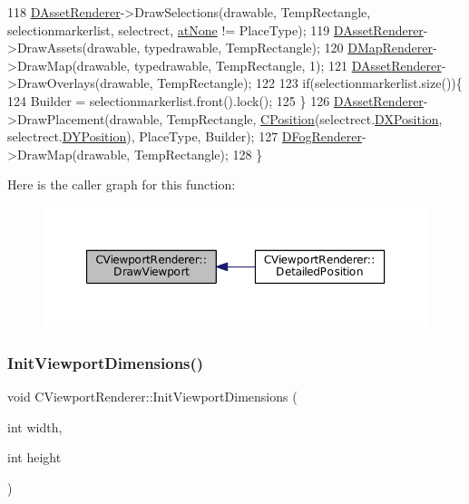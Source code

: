 \begin{DoxyCode}
118     \hyperlink{classCViewportRenderer_a3daa075c87bbdde4d1ada41f0b98f4a8}{DAssetRenderer}->DrawSelections(drawable, TempRectangle, selectionmarkerlist, selectrect, 
      \hyperlink{GameDataTypes_8h_a5600d4fc433b83300308921974477feca82fb51718e2c00981a2d37bc6fe92593}{atNone} != PlaceType);
119     \hyperlink{classCViewportRenderer_a3daa075c87bbdde4d1ada41f0b98f4a8}{DAssetRenderer}->DrawAssets(drawable, typedrawable, TempRectangle);
120     \hyperlink{classCViewportRenderer_ac6bc7771bd6dcd35107d25bebb0c0a4c}{DMapRenderer}->DrawMap(drawable, typedrawable, TempRectangle, 1);
121     \hyperlink{classCViewportRenderer_a3daa075c87bbdde4d1ada41f0b98f4a8}{DAssetRenderer}->DrawOverlays(drawable, TempRectangle);
122     
123     \textcolor{keywordflow}{if}(selectionmarkerlist.size())\{
124         Builder = selectionmarkerlist.front().lock();  
125     \}
126     \hyperlink{classCViewportRenderer_a3daa075c87bbdde4d1ada41f0b98f4a8}{DAssetRenderer}->DrawPlacement(drawable, TempRectangle, 
      \hyperlink{classCPosition}{CPosition}(selectrect.\hyperlink{structSRectangle_abcbddb03b3ee416cc33109833b5f075c}{DXPosition}, selectrect.\hyperlink{structSRectangle_a120aa0a90033bc6e07c36c151a3bbc71}{DYPosition}), PlaceType, Builder);
127     \hyperlink{classCViewportRenderer_a2fa9d183d00bdba4a2fea6d946992608}{DFogRenderer}->DrawMap(drawable, TempRectangle);
128 \}
\end{DoxyCode}
Here is the caller graph for this function\+:
\nopagebreak
\begin{figure}[H]
\begin{center}
\leavevmode
\includegraphics[width=350pt]{classCViewportRenderer_ad5cf67fd6d4d69f861dbc0b773cdcab2_icgraph}
\end{center}
\end{figure}
\hypertarget{classCViewportRenderer_ab033e4011819d904d25c74e8876e0517}{}\label{classCViewportRenderer_ab033e4011819d904d25c74e8876e0517} 
\subsubsection{\texorpdfstring{Init\+Viewport\+Dimensions()}{InitViewportDimensions()}}
{\footnotesize\ttfamily void C\+Viewport\+Renderer\+::\+Init\+Viewport\+Dimensions (\begin{DoxyParamCaption}\item[{int}]{width,  }\item[{int}]{height }\end{DoxyParamCaption})\hspace{0.3cm}{\ttfamily [inline]}}



